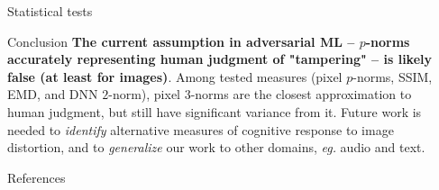 \documentclass[final,notheorems]{beamer}
\newlength{\sepwidth}
\newlength{\colwidth}
\newcommand{\separatorcolumn}{\begin{column}{\sepwidth}\end{column}}
\begin{document}
\begin{frame}[t]
\begin{columns}[t]
\begin{column}{\colwidth}
\begin{block}{Statistical tests}
  \end{block}

  \begin{alertblock}{Conclusion}
    \textbf{The current assumption in adversarial ML -- $p$-norms accurately representing human judgment of "tampering" -- is likely false (at least for images)}.
    Among tested measures (pixel $p$-norms, SSIM, EMD, and DNN $2$-norm), pixel $3$-norms are the closest approximation to human judgment, but still have significant variance from it. Future work is needed to \emph{identify} alternative measures of cognitive response to image distortion, and to \emph{generalize} our work to other domains, \textit{eg.} audio and text.
  \end{alertblock}

  \begin{block}{References}
    \footnotesize{\printbibliography}
  \end{block}

\end{column}

\separatorcolumn
\end{columns}
\end{frame}
\end{document}
